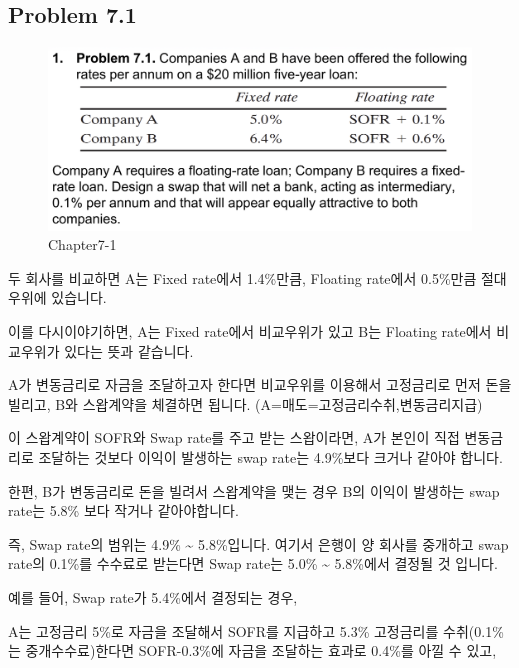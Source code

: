 \documentclass[
  letterpaper,
  DIV=11,
  numbers=noendperiod]{scrreprt}
\begin{document}

\subsection*{\texorpdfstring{\textbf{Problem
7.1}}{Problem 7.1}}\label{problem-7.1}

\begin{figure}[H]

{\centering \includegraphics{images/선물옵션_7-1.png}

}

\caption{Chapter7-1}

\end{figure}%

두 회사를 비교하면 A는 Fixed rate에서 1.4\%만큼, Floating rate에서
0.5\%만큼 절대우위에 있습니다.

이를 다시이야기하면, A는 Fixed rate에서 비교우위가 있고 B는 Floating
rate에서 비교우위가 있다는 뜻과 같습니다.

A가 변동금리로 자금을 조달하고자 한다면 비교우위를 이용해서 고정금리로
먼저 돈을 빌리고, B와 스왑계약을 체결하면 됩니다.
(A=매도=고정금리수취,변동금리지급)

이 스왑계약이 SOFR와 Swap rate를 주고 받는 스왑이라면, A가 본인이 직접
변동금리로 조달하는 것보다 이익이 발생하는 swap rate는 4.9\%보다 크거나
같아야 합니다.

한편, B가 변동금리로 돈을 빌려서 스왑계약을 맺는 경우 B의 이익이
발생하는 swap rate는 5.8\% 보다 작거나 같아야합니다.

즉, Swap rate의 범위는 4.9\% \textasciitilde{} 5.8\%입니다. 여기서
은행이 양 회사를 중개하고 swap rate의 0.1\%를 수수료로 받는다면 Swap
rate는 5.0\% \textasciitilde{} 5.8\%에서 결정될 것 입니다.

예를 들어, Swap rate가 5.4\%에서 결정되는 경우,

A는 고정금리 5\%로 자금을 조달해서 SOFR를 지급하고 5.3\% 고정금리를
수취(0.1\%는 중개수수료)한다면 SOFR-0.3\%에 자금을 조달하는 효과로
0.4\%를 아낄 수 있고,
\end{document}
